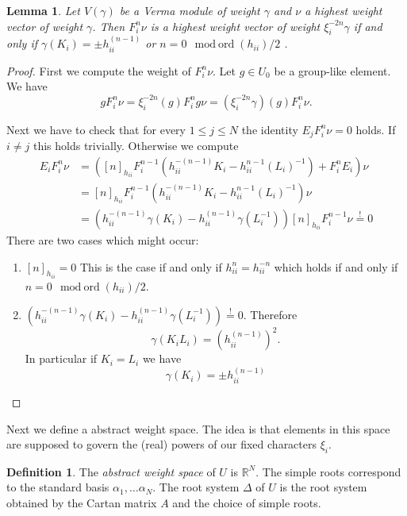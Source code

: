 \documentclass{amsart}
\newtheorem{lemma}[theorem]{Lemma}
\theoremstyle{definition}
\newtheorem{definition}[theorem]{Definition}
\begin{document}
\begin{lemma}\label{lem: HigWeightInVermMods}
	Let $V(\gamma)$ be a Verma module of weight $\gamma$ and $\nu$ a highest weight vector of weight $\gamma$.
	Then $F_i^n \nu$ is a highest weight vector of weight 
	$
		\xi_i^{-2n}\gamma
	$
	if and only if
	$
		\gamma(K_i) = \pm h_{ii}^{(n-1)}
	$ or $n=0 \mod \text{ord} (h_{ii})/2$ .
\end{lemma}
\begin{proof}	
	First we compute the weight of $F_i^n \nu$.
	Let $g \in U_0$ be a group-like element. We have
	$$
		g F_i^n \nu = \xi_i^{-2n}(g) F_i^n  g \nu  = (\xi_i^{-2n}\gamma)(g) F_i^n  \nu.
	$$
	
	
	Next we have to check that for every $1\leq j\leq N$ the identity
	$
		E_jF_i^n \nu = 0
	$ holds.
	If $i\neq j$ this holds trivially.
	Otherwise we compute 
	\begin{align*}
		E_iF_i^n \nu 
		& = 
		([n]_{h_{ii}}F_i^{n-1}(h_{ii}^{-(n-1)} K_i - h_{ii}^{n-1}(L_i)^{-1}) + F_i^n E_i) 
		\nu \\
		& = [n]_{h_{ii}}F_i^{n-1}(h_{ii}^{-(n-1)} K_i - h_{ii}^{n-1}(L_i)^{-1}) \nu \\
		& = \left( 
		h_{ii}^{-(n-1)} \gamma (K_i) - h_{ii}^{(n-1)}\gamma(L_i^{-1}) \right)	[n]_{h_{ii}}F_i^{n-1} \nu  \overset{!}{=} 0
	\end{align*}
	There are two cases which might occur:
	\begin{enumerate}
		\item $[n]_{h_{ii}}=0$ This is the case if and only if 
		$h_{ii}^n =  h_{ii}^{-n}$ which holds if and only if $n=0 \mod \text{ord} (h_{ii})/2$.
		\item 	$
		\left( 
		h_{ii}^{-(n-1)} \gamma (K_i) - h_{ii}^{(n-1)}\gamma(L_i^{-1}) \right)
		\overset{!}{=} 0.
		$
		Therefore
		$$
			\gamma(K_iL_i) = \left( h_{ii}^{(n-1)}\right) ^2. 
		$$
		In particular if $K_i = L_i$ we have
		$$
			\gamma(K_i) = \pm h_{ii}^{(n-1)}
		$$
	\end{enumerate}	
\end{proof}


Next we define a abstract weight space. The idea is that elements in this space are supposed to govern the (real) powers of our fixed characters $\xi_i$. 

\begin{definition}
	The \emph{abstract weight space} of $U$ is $\mathbb R^N$.
	The simple roots correspond to the standard basis $\alpha_1, \dotsc \alpha_N$. 
	The root system $\Delta$ of $U$ is the root system obtained by the Cartan matrix $A$ and the choice of simple roots.
\end{definition}
\end{document}
